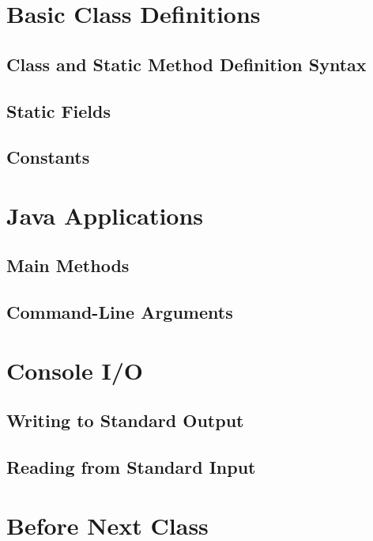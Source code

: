 \section{Basic Class Definitions}

\subsection{Class and Static Method Definition Syntax}

\subsection{Static Fields}

\subsection{Constants}



\section{Java Applications}

\subsection{Main Methods}

\subsection{Command-Line Arguments}



\section{Console I/O}

\subsection{Writing to Standard Output}

\subsection{Reading from Standard Input}



\section{Before Next Class}

